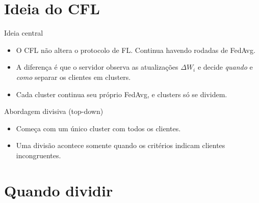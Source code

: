 \documentclass[aspectratio=169]{beamer}
\begin{document}
\section{Ideia do CFL}

\begin{frame}{Ideia central}
  \begin{itemize}
    \item O CFL não altera o protocolo de FL. Continua havendo rodadas de FedAvg.
    \item A diferença é que o servidor observa as atualizações $\Delta W_i$ e decide
      \emph{quando} e \emph{como} separar os clientes em clusters.
    \item Cada cluster continua seu próprio FedAvg, e clusters só se dividem.
  \end{itemize}
\end{frame}

\begin{frame}{Abordagem divisiva (top-down)}
  \begin{center}
  \end{center}
  \vspace{0.3em}
  \begin{itemize}
    \item Começa com um único cluster com todos os clientes.
    \item Uma divisão acontece somente quando os critérios indicam clientes incongruentes.
  \end{itemize}
\end{frame}

\section{Quando dividir}
\end{document}
